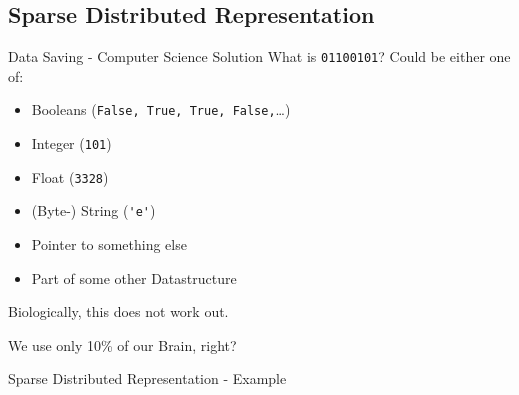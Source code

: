 
\subsection{Sparse Distributed Representation}


\begin{frame}[c,fragile]{Data Saving - Computer Science Solution}
    \Large
    What is \verb|01100101|? \pause Could be either one of:
    \begin{itemize}[<+(1)->]
        \item Booleans (\verb|False, True, True, False,|\dots)
        \item Integer (\verb|101|)
        \item Float (\verb|3328|)
        \item (Byte-) String (\verb|'e'|)
        \item Pointer to something else
        \item Part of some other Datastructure
    \end{itemize}
\end{frame}

% 
% 
% 


\begin{frame}[standout]
    \Large
    Biologically, this does not work out.

    \pause
    We use only 10\% of our Brain, right?
\end{frame}


\begin{frame}[c]{Sparse Distributed Representation - Example}
\end{frame}


